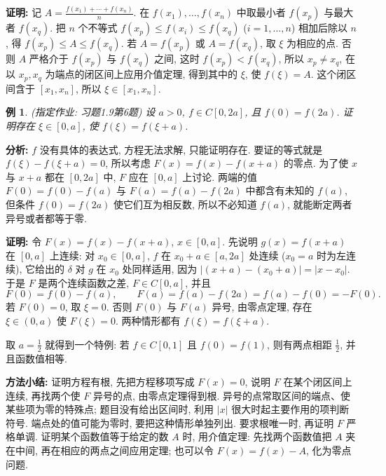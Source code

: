 \documentclass[UTF8,openany]{ctexbook}
\theoremstyle{chinesetextbook}
\newtheorem{example}{例}[section]
\newenvironment{cnproof}{\par\indent\textbf{证明:} \ignorespaces}{\par}
\begin{document}
\begin{cnproof}
记 $\displaystyle A=\frac{f(x_1)+\cdots+f(x_n)}n$. 在 $f(x_1),\ldots,f(x_n)$ 中取最小者 $f(x_p)$ 与最大者 $f(x_q)$. 把 $n$ 个不等式 $f(x_p)\le f(x_i)\le f(x_q)$ ($i=1,\ldots,n$) 相加后除以 $n$, 得 $f(x_p)\le A\le f(x_q)$. 若 $A=f(x_p)$ 或 $A=f(x_q)$, 取 $\xi$ 为相应的点. 否则 $A$ 严格介于 $f(x_p)$ 与 $f(x_q)$ 之间, 这时 $f(x_p)<f(x_q)$, 所以 $x_p\ne x_q$, 在以 $x_p,x_q$ 为端点的闭区间上应用介值定理, 得到其中的 $\xi$, 使 $f(\xi)=A$. 这个闭区间含于 $[x_1,x_n]$, 所以 $\xi\in[x_1,x_n]$.
\end{cnproof}
\begin{example}
\textnormal{(指定作业: 习题1.9第6题)} 设 $a>0$, $f\in C[0,2a]$, 且 $f(0)=f(2a)$. 证明存在 $\xi\in[0,a]$, 使 $f(\xi)=f(\xi+a)$.
\end{example}
\par\indent\textbf{分析:} $f$ 没有具体的表达式, 方程无法求解, 只能证明存在. 要证的等式就是 $f(\xi)-f(\xi+a)=0$, 所以考虑 $F(x)=f(x)-f(x+a)$ 的零点. 为了使 $x$ 与 $x+a$ 都在 $[0,2a]$ 中, $F$ 应在 $[0,a]$ 上讨论. 两端的值 $F(0)=f(0)-f(a)$ 与 $F(a)=f(a)-f(2a)$ 中都含有未知的 $f(a)$, 但条件 $f(0)=f(2a)$ 使它们互为相反数, 所以不必知道 $f(a)$, 就能断定两者异号或者都等于零.
\begin{cnproof}
令 $F(x)=f(x)-f(x+a)$, $x\in[0,a]$. 先说明 $g(x)=f(x+a)$ 在 $[0,a]$ 上连续: 对 $x_0\in[0,a]$, $f$ 在 $x_0+a\in[a,2a]$ 处连续 ($x_0=a$ 时为左连续), 它给出的 $\delta$ 对 $g$ 在 $x_0$ 处同样适用, 因为 $|(x+a)-(x_0+a)|=|x-x_0|$. 于是 $F$ 是两个连续函数之差, $F\in C[0,a]$, 并且
\[
F(0)=f(0)-f(a),\qquad F(a)=f(a)-f(2a)=f(a)-f(0)=-F(0).
\]
若 $F(0)=0$, 取 $\xi=0$. 否则 $F(0)$ 与 $F(a)$ 异号, 由零点定理, 存在 $\xi\in(0,a)$ 使 $F(\xi)=0$. 两种情形都有 $f(\xi)=f(\xi+a)$.
\end{cnproof}
取 $\displaystyle a=\frac12$ 就得到一个特例: 若 $f\in C[0,1]$ 且 $f(0)=f(1)$, 则有两点相距 $\displaystyle\frac12$, 并且函数值相等.

\par\indent\textbf{方法小结:} 证明方程有根, 先把方程移项写成 $F(x)=0$, 说明 $F$ 在某个闭区间上连续, 再找两个使 $F$ 异号的点, 由零点定理得到根. 异号的点常取区间的端点、使某些项为零的特殊点; 题目没有给出区间时, 利用 $|x|$ 很大时起主要作用的项判断符号. 端点处的值可能为零时, 要把这种情形单独列出. 要求根唯一时, 再证明 $F$ 严格单调. 证明某个函数值等于给定的数 $A$ 时, 用介值定理: 先找两个函数值把 $A$ 夹在中间, 再在相应的两点之间应用定理; 也可以令 $F(x)=f(x)-A$, 化为零点问题.
\end{document}

